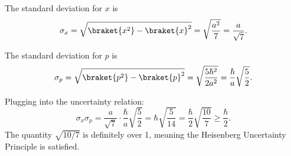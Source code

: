 \begin{parts}
    \item The standard deviation for $x$ is
        \begin{equation*}
            \sigma_x = \sqrt{\braket{x^2} - \braket{x}^2} = \sqrt{\frac{a^2}{7}} = \frac{a}{\sqrt{7}}.
        \end{equation*}
    \item The standard deviation for $p$ is
        \begin{equation*}
            \sigma_p = \sqrt{\braket{p^2} - \braket{p}^2} = \sqrt{\frac{5\hbar^2}{2a^2}} = \frac{\hbar}{a}\sqrt{\frac{5}{2}}.
        \end{equation*}
    \item Plugging into the uncertainty relation:
        \begin{equation*}
            \sigma_x\sigma_p = \frac{a}{\sqrt{7}} \cdot \frac{\hbar}{a}\sqrt{\frac{5}{2}} = \hbar \sqrt{\frac{5}{14}} = \frac{\hbar}{2} \sqrt{\frac{10}{7}} \geq \frac{\hbar}{2}.
        \end{equation*}
        The quantity $\sqrt{10/7}$ is definitely over 1, meaning the Heisenberg Uncertainty Principle is satisfied.
\end{parts}